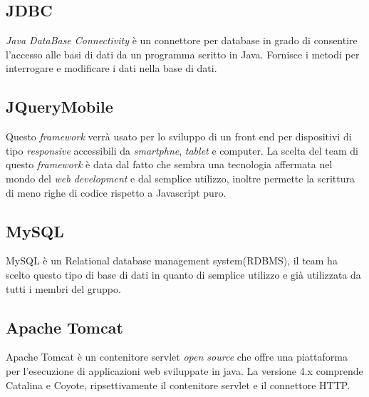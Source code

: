 \subsection{JDBC}
\textit{Java DataBase Connectivity} è un connettore per database in grado di consentire l'accesso alle basi di dati da un programma scritto in Java. Fornisce i metodi per interrogare e modificare i dati nella base di dati.
\subsection{JQueryMobile}
Questo \textit{framework} verrà usato per lo sviluppo di un front end per dispositivi di tipo \textit{responsive} accessibili da \textit{smartphne}, \textit{tablet} e computer. La scelta del team di questo \textit{framework} è data dal fatto che sembra una tecnologia affermata nel mondo del \textit{web development} e dal semplice utilizzo, inoltre permette la scrittura di meno righe di codice rispetto a Javascript puro.
\subsection{MySQL}
MySQL è un Relational database management system(RDBMS), il team ha scelto questo tipo di base di dati in quanto di semplice utilizzo e già utilizzata da tutti i membri del gruppo.
\subsection{Apache Tomcat}
Apache Tomcat è un contenitore servlet \textit{open source} che offre una piattaforma per l'esecuzione di applicazioni web sviluppate in java. La versione 4.x comprende Catalina e Coyote, ripsettivamente il contenitore servlet e il connettore HTTP.